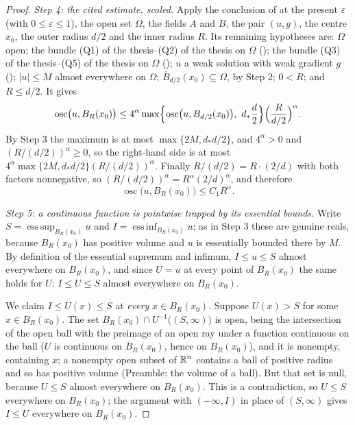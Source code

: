 \begin{proof}
\emph{Step 4: the cited estimate, scaled.}  Apply the conclusion of
 at the present $\varepsilon$ (with
$0\le\varepsilon\le1$), the open set $\Omega$, the fields $A$ and $B$, the pair
$(u,g)$, the centre $x_0$, the outer radius $d/2$ and the inner radius $R$.  Its
remaining hypotheses are: $\Omega$ open; the bundle
(Q1) of the thesis--(Q2) of the thesis on $\Omega$
(); the bundle (Q3) of the thesis--(Q5) of the thesis on
$\Omega$ (); $u$ a weak solution with weak
gradient $g$ (); $|u|\le M$ almost everywhere on
$\Omega$; $\overline B_{d/2}(x_0)\subseteq\Omega$, by Step 2; $0<R$; and
$R\le d/2$.  It gives
\[
\operatorname*{osc}\bigl(u,B_R(x_0)\bigr)
\le4^{\alpha}\max\Bigl\{\operatorname*{osc}\bigl(u,B_{d/2}(x_0)\bigr),\
d_\ast\frac d2\Bigr\}\Bigl(\frac{R}{d/2}\Bigr)^{\alpha}.
\]
By Step 3 the maximum is at most $\max\{2M,d_\ast d/2\}$, and
$4^{\alpha}>0$ and $(R/(d/2))^{\alpha}\ge0$, so the right-hand side is at most
$4^{\alpha}\max\{2M,d_\ast d/2\}(R/(d/2))^{\alpha}$.  Finally
$R/(d/2)=R\cdot(2/d)$ with both factors nonnegative, so
$(R/(d/2))^{\alpha}=R^{\alpha}(2/d)^{\alpha}$, and therefore
\[
\operatorname*{osc}\bigl(u,B_R(x_0)\bigr)\le C_1R^{\alpha}.
\tag{4}
\]

\emph{Step 5: a continuous function is pointwise trapped by its essential
bounds.}  Write $S=\operatorname{ess\,sup}_{B_R(x_0)}u$ and
$I=\operatorname{ess\,inf}_{B_R(x_0)}u$; as in Step 3 these are genuine reals,
because $B_R(x_0)$ has positive volume and $u$ is essentially bounded there by
$M$.  By definition of the essential supremum and infimum, $I\le u\le S$ almost
everywhere on $B_R(x_0)$, and since $U=u$ at every point of $B_R(x_0)$ the same
holds for $U$: $I\le U\le S$ almost everywhere on $B_R(x_0)$.

We claim $I\le U(x)\le S$ at \emph{every} $x\in B_R(x_0)$.  Suppose
$U(x)>S$ for some $x\in B_R(x_0)$.  The set
$B_R(x_0)\cap U^{-1}\bigl((S,\infty)\bigr)$ is open, being the intersection of
the open ball with the preimage of an open ray under a function continuous on
the ball ($U$ is continuous on $\overline B_R(x_0)$, hence on $B_R(x_0)$), and
it is nonempty, containing $x$; a nonempty open subset of $\mathbb{R}^n$ contains a
ball of positive radius and so has positive volume (Preamble: the volume of a
ball).  But that set is null, because $U\le S$ almost everywhere on
$B_R(x_0)$.  This is a contradiction, so $U\le S$ everywhere on $B_R(x_0)$; the
argument with $(-\infty,I)$ in place of $(S,\infty)$ gives $I\le U$ everywhere
on $B_R(x_0)$.


\end{proof}
